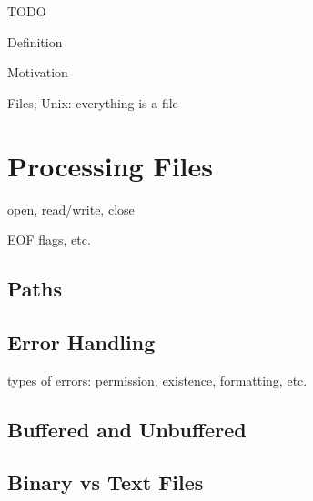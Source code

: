 

TODO

Definition

Motivation

Files; Unix: everything is a file

\section{Processing Files}

open, read/write, close

EOF flags, etc.

\subsection{Paths}

\subsection{Error Handling}

types of errors: permission, existence, formatting, etc.

\subsection{Buffered and Unbuffered}

\subsection{Binary vs Text Files}
